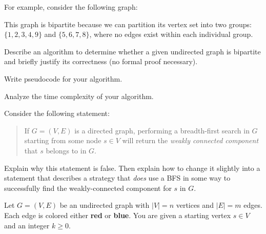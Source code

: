\documentclass[11  pt]{article}
\begin{document}
For example, consider the following graph:

\begin{center}
\end{center}

This graph is bipartite because we can partition its vertex set into two groups:  
$\{1,2,3,4,9\}$ and $\{5,6,7,8\}$, where no edges exist within each individual group.

\babc
\item 
Describe an algorithm to determine whether a given undirected graph is bipartite and briefly justify its correctness (no formal proof necessary).
\item
Write pseudocode for your algorithm.
\item 
Analyze the time complexity of your algorithm.
\eabc


\vspace{0.5in}

\exercise 
Consider the following statement:
\begin{quote}
If $G = (V,E)$ is a directed graph, performing a breadth-first search in $G$ starting from some node $s \in V$ will return the \emph{weakly connected component} that $s$ belongs to in $G$.
\end{quote}
Explain why this statement is false. 
Then explain how to change it slightly into a statement that describes a strategy that \textit{does} use a BFS in some way to successfully find the weakly-connected component for $s$ in $G$.

\newpage
\challenge
Let $G = (V, E)$ be an undirected graph with $|V| = n$ vertices and $|E| = m$ edges.  
Each edge is colored either \textbf{red} or \textbf{blue}.  
You are given a starting vertex $s \in V$ and an integer $k \ge 0$.
\end{document}

